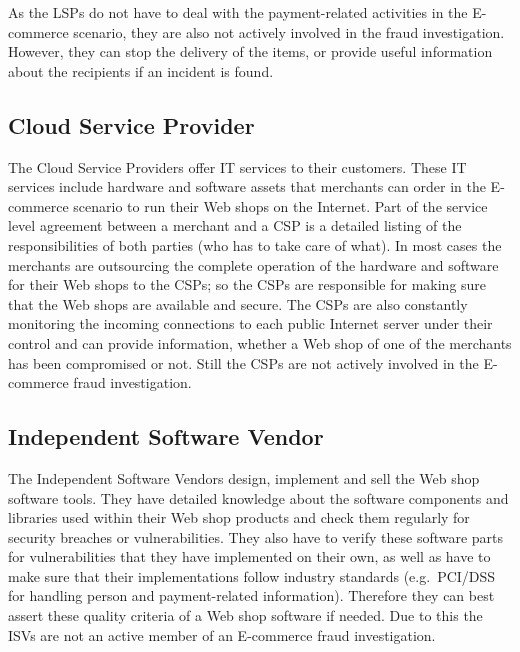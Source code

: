 As the \gls{LSP}s do not have to deal with the payment-related activities in the \gls{E-commerce} scenario, they are also not actively involved in the fraud investigation. However, they can stop the delivery of the items, or provide useful information about the recipients if an incident is found.


\subsection{Cloud Service Provider}
\label{subsec:stakeholder_csp}

The Cloud Service Providers offer \gls{IT} services to their customers. These \gls{IT} services include hardware and software assets that merchants can order in the \gls{E-commerce} scenario to run their Web shops on the Internet. Part of the service level agreement between a merchant and a \gls{CSP} is a detailed listing of the responsibilities of both parties (who has to take care of what). In most cases the merchants are outsourcing the complete operation of the hardware and software for their Web shops to the \gls{CSP}s; so the \gls{CSP}s are responsible for making sure that the Web shops are available and secure. The \gls{CSP}s are also constantly monitoring the incoming connections to each public Internet server under their control and can provide information, whether a Web shop of one of the merchants has been compromised or not. Still the \gls{CSP}s are not actively involved in the \gls{E-commerce} fraud investigation.


\subsection{Independent Software Vendor}
\label{subsec:stakeholder_isv}

The Independent Software Vendors design, implement and sell the Web shop software tools. They have detailed knowledge about the software components and libraries used within their Web shop products and check them regularly for security breaches or vulnerabilities. They also have to verify these software parts for vulnerabilities that they have implemented on their own, as well as have to make sure that their implementations follow industry standards (e.g.\ \gls{PCI/DSS} for handling person and payment-related information). Therefore they can best assert these quality criteria of a Web shop software if needed. Due to this the \gls{ISV}s are not an active member of an \gls{E-commerce} fraud investigation.

